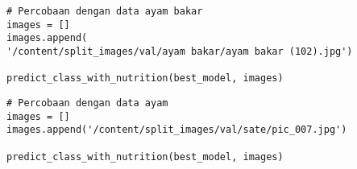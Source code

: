\begin{lstlisting}[style=customc]
# Percobaan dengan data ayam bakar
images = []
images.append(
'/content/split_images/val/ayam bakar/ayam bakar (102).jpg') 

predict_class_with_nutrition(best_model, images)
\end{lstlisting}

\begin{lstlisting}[style=customc]
# Percobaan dengan data ayam
images = []
images.append('/content/split_images/val/sate/pic_007.jpg')

predict_class_with_nutrition(best_model, images)
\end{lstlisting}











